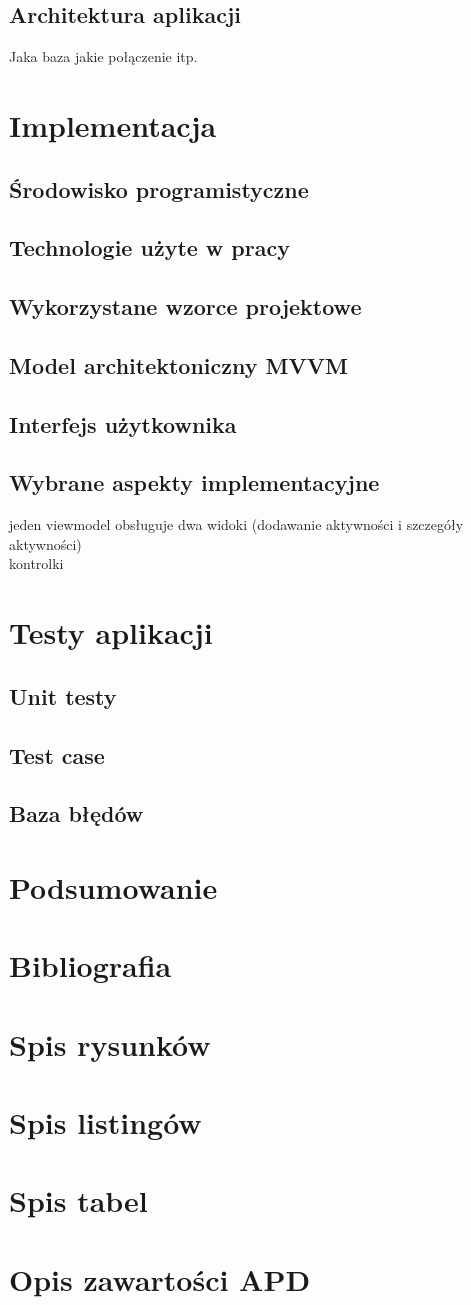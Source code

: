 \documentclass[12pt,twoside]{report}
\begin{document}
\section{Architektura aplikacji}
Jaka baza jakie połączenie itp.
\chapter{Implementacja}

\section{Środowisko programistyczne}
\section{Technologie użyte w pracy}
\section{Wykorzystane wzorce projektowe}
\section{Model architektoniczny MVVM}
\section{Interfejs użytkownika}
\section{Wybrane aspekty implementacyjne}
jeden viewmodel obsługuje dwa widoki (dodawanie aktywności i szczegóły aktywności) \\
kontrolki\\
\chapter{Testy aplikacji}
\section{Unit testy}
\section{Test case}
\section{Baza błędów}
\chapter{Podsumowanie}
\chapter{Bibliografia}
\chapter{Spis rysunków}
\chapter{Spis listingów}
\chapter{Spis tabel}
\chapter{Opis zawartości APD}
\end{document}
